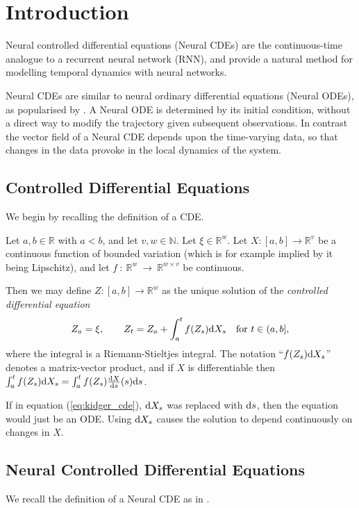 \section{Introduction}
Neural controlled differential equations (Neural CDEs) \citep{kidger2020neural} are the continuous-time analogue to a recurrent neural network (RNN), and provide a natural method for modelling temporal dynamics with neural networks.

Neural CDEs are similar to neural ordinary differential equations (Neural ODEs), as popularised by \citet{neural2018ode}. A Neural ODE is determined by its initial condition, without a direct way to modify the trajectory given subsequent observations. In contrast the vector field of a Neural CDE depends upon the time-varying data, so that changes in the data provoke in the local dynamics of the system.

\subsection{Controlled Differential Equations}
We begin by recalling the definition of a CDE.

Let $a, b \in \mathbb{R}$ with $a < b$, and let $v, w \in \mathbb{N}$. Let $\xi \in \mathbb{R}^w$. Let $X \colon [a, b] \to \mathbb{R}^v$ be a continuous function of bounded variation (which is for example implied by it being Lipschitz), and let $f~\colon~\mathbb{R}^w~\to~\mathbb{R}^{w \times v}$ be continuous.

Then we may define $Z: [a, b] \to \mathbb{R}^w$ as the unique solution of the \emph{controlled differential equation}
\begin{equation}
    Z_a = \xi,\qquad Z_t = Z_a + \int^{t}_{a} f(Z_s) \mathrm{d} X_s \quad \text{for } t \in (a, b],
    \label{eq:kidger_cde}
\end{equation}
where the integral is a Riemann-Stieltjes integral. The notation ``$f(Z_s) \mathrm{d} X_s$'' denotes a matrix-vector product, and if $X$ is differentiable then $\int_a^t f(Z_s) \mathrm{d} X_s = \int_a^t f(Z_s) \frac{\mathrm{d} X}{\mathrm{d} s}(s) \mathrm{d} s$.

If in equation (\ref{eq:kidger_cde}), $\mathrm{d} X_s$ was replaced with $\mathrm{d} s$, then the equation would just be an ODE. Using $\mathrm{d} X_s$ causes the solution to depend continuously on changes in $X$.

\subsection{Neural Controlled Differential Equations}
We recall the definition of a Neural CDE as in \citet{kidger2020neural}.

